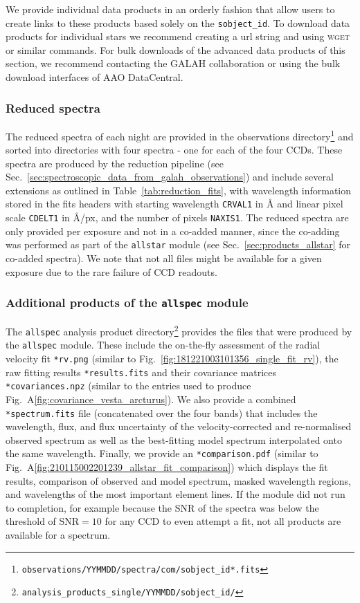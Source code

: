 \documentclass[
  journal=pasa,
  manuscript=research-paper, %
  year=2024,
  volume=37
]{cup-journal}
\begin{document}
We provide individual data products in an orderly fashion that allow users to create links to these products based solely on the \texttt{sobject\_id}. To download data products for individual stars we recommend creating a url string and using \textsc{wget} or similar commands. For bulk downloads of the advanced data products of this section, we recommend contacting the GALAH collaboration or using the bulk download interfaces of AAO DataCentral.

\subsubsection{Reduced spectra} \label{sec:reduced_spectra}

The reduced spectra of each night are provided in the observations directory\footnote{\texttt{observations/YYMMDD/spectra/com/sobject\_id*.fits}} and sorted into directories with four spectra - one for each of the four CCDs. These spectra are produced by the reduction pipeline (see Sec.~\ref{sec:spectroscopic_data_from_galah_observations}) and include several extensions as outlined in Table~\ref{tab:reduction_fits}, with wavelength information stored in the fits headers with starting wavelength \texttt{CRVAL1} in \AA\xspace and linear pixel scale \texttt{CDELT1} in \AA/px, and the number of pixels \texttt{NAXIS1}. The reduced spectra are only provided per exposure and not in a co-added manner, since the co-adding was performed as part of the \texttt{allstar} module (see Sec.~\ref{sec:products_allstar} for co-added spectra). We note that not all files might be available for a given exposure due to the rare failure of CCD readouts.

\subsubsection{Additional products of the \texttt{allspec} module} \label{sec:products_allspec}

The \texttt{allspec} analysis product directory\footnote{\texttt{analysis\_products\_single/YYMMDD/sobject\_id/}} provides the files that were produced by the \texttt{allspec} module. These include the on-the-fly assessment of the radial velocity fit \texttt{*rv.png} (similar to Fig.~\ref{fig:181221003101356_single_fit_rv}), the raw fitting results \texttt{*results.fits} and their covariance matrices \texttt{*covariances.npz} (similar to the entries used to produce Fig.~A\ref{fig:covariance_vesta_arcturus}). We also provide a combined \texttt{*spectrum.fits} file (concatenated over the four bands) that includes the wavelength, flux, and flux uncertainty of the velocity-corrected and re-normalised observed spectrum as well as the best-fitting model spectrum interpolated onto the same wavelength. Finally, we provide an \texttt{*comparison.pdf} (similar to Fig.~A\ref{fig:210115002201239_allstar_fit_comparison}) which displays the fit results, comparison of observed and model spectrum, masked wavelength regions, and wavelengths of the most important element lines. If the module did not run to completion, for example because the SNR of the spectra was below the threshold of $\mathrm{SNR} = 10$ for any CCD to even attempt a fit, not all products are available for a spectrum.
\end{document}

